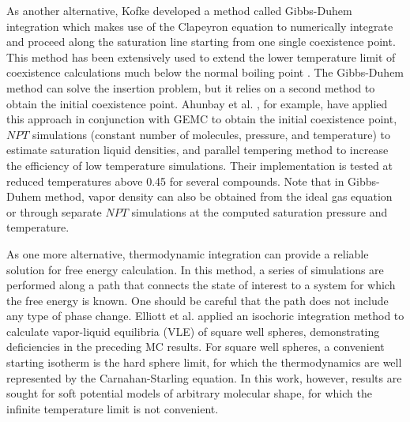 \documentclass[5p,times]{elsarticle}
\begin{document}
As another alternative, Kofke \cite{Kofke1993b} developed a method called Gibbs-Duhem integration which makes use of the Clapeyron equation to numerically integrate and proceed along the saturation line starting from one single coexistence point. This method has been extensively used to extend the lower temperature limit of coexistence calculations much below the normal boiling point \cite{Ahunbay2004} \cite{Vega2009} \citep{Ungerer2000} \cite{Vega2006} \cite{Yiannourakou2018}. The Gibbs-Duhem method can solve the insertion problem, but it relies on a second method to obtain the initial coexistence point. Ahunbay et al. \cite{Ahunbay2004}, for example, have applied this approach in conjunction with GEMC to obtain the initial coexistence point, $NPT$ simulations (constant number of molecules, pressure, and temperature) to estimate saturation liquid densities, and parallel tempering method \cite{Yan1999} to increase the efficiency of low temperature simulations. Their implementation is tested at reduced temperatures above 0.45 for several compounds. Note that in Gibbs-Duhem method, vapor density can also be obtained from the ideal gas equation or through separate $NPT$ simulations at the computed saturation pressure and temperature.


As one more alternative, thermodynamic integration can provide a reliable solution for free energy calculation. In this method, a series of simulations are performed along a path that connects the state of interest to a system for which the free energy is known. One should be careful that the path does not include any type of phase change\cite{Vega2009}. Elliott et al. \cite{Elliott1999a} applied an isochoric integration method to calculate vapor-liquid equilibria (VLE) of square well spheres, demonstrating deficiencies in the preceding MC results.  For square well spheres, a convenient starting isotherm is the hard sphere limit, for which the thermodynamics are well represented by the Carnahan-Starling equation\cite{Carnahan1969a}. In this work, however, results are sought for soft potential models of arbitrary molecular shape, for which the infinite temperature limit is not convenient. 
\end{document}
